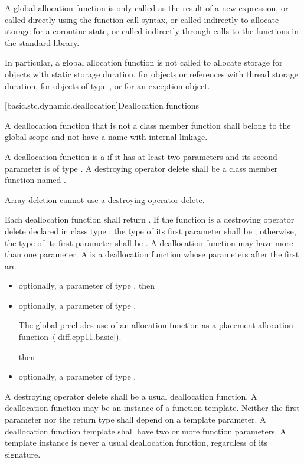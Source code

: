 \pnum
A global allocation function is only called as the result of a new
expression, or called directly using the function call
syntax, or called indirectly to allocate storage for
a coroutine state,
or called indirectly through calls to the
functions in the \Cpp{} standard library.
\begin{note}
In particular, a
global allocation function is not called to allocate storage for objects
with static storage duration, for objects or references
with thread storage duration, for objects of
type , or for an
exception object.
\end{note}

[basic.stc.dynamic.deallocation]{Deallocation functions}

\pnum
{}%
A deallocation function that is not a class member function
shall belong to the global scope and not have a name with internal linkage.

\pnum
A deallocation function
is a 
if it has at least two parameters
and its second parameter
is of type .
A destroying operator delete
shall be a class member function named .
\begin{note}
Array deletion cannot use a destroying operator delete.
\end{note}

\pnum
{}%
Each deallocation function shall return .
If the function is a destroying operator delete
declared in class type ,
the type of its first parameter shall be ;
otherwise, the type of its first
parameter shall be . A deallocation function may have more
than one parameter.
%
A  is a deallocation function
whose parameters after the first are
\begin{itemize}
\item
optionally, a parameter of type , then
\item
optionally, a parameter of type ,
\begin{footnote}
The global 
precludes use of an
allocation function  as a placement
allocation function~(\ref{diff.cpp11.basic}).
\end{footnote}
then
\item
optionally, a parameter of type .
\end{itemize}
A destroying operator delete shall be a usual deallocation function.
A deallocation function may be an instance of a function
template. Neither the first parameter nor the return type shall depend
on a template parameter.
A deallocation
function template shall have two or more function parameters. A template
instance is never a usual deallocation function, regardless of its
signature.

